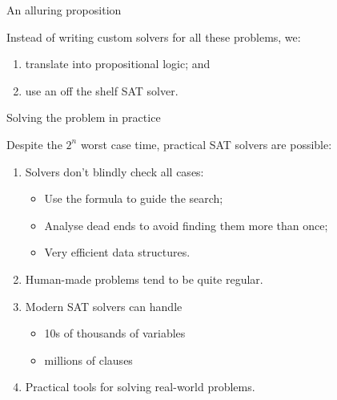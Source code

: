 \documentclass[xetex,aspectratio=169,14pt,hyperref={pdfpagelabels=true,pdflang={en-GB}}]{beamer}
\begin{document}
\begin{frame}
  {An alluring proposition}

  Instead of writing custom solvers for all these problems, we:
  \begin{enumerate}
  \item translate into propositional logic; and
  \item use an off the shelf SAT solver.
  \end{enumerate}
\end{frame}

\begin{frame}
  {Solving the problem in practice}

  Despite the $2^n$ worst case time, practical SAT solvers are possible:
  \begin{enumerate}
  \item Solvers don't blindly check all cases:
    \begin{itemize}
    \item Use the formula to guide the search;
    \item Analyse dead ends to avoid finding them more than once;
    \item Very efficient data structures.
    \end{itemize}
  \item Human-made problems tend to be quite regular.
  \item Modern SAT solvers can handle
    \begin{itemize}
    \item 10s of thousands of variables
    \item millions of clauses
    \end{itemize}
  \item Practical tools for solving real-world problems.
  \end{enumerate}
\end{frame}
\end{document}
